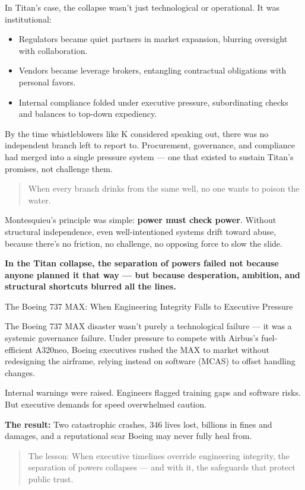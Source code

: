 \medskip

In Titan's case, the collapse wasn't just technological or operational. It was institutional:

\begin{itemize}
    \item Regulators became quiet partners in market expansion, blurring oversight with collaboration.
    \item Vendors became leverage brokers, entangling contractual obligations with personal favors.
    \item Internal compliance folded under executive pressure, subordinating checks and balances to top-down expediency.
\end{itemize}

By the time whistleblowers like K considered speaking out, there was no independent branch left to report to. Procurement, governance, and compliance had merged into a single pressure system — one that existed to sustain Titan's promises, not challenge them.

\medskip

\begin{quote}
    When every branch drinks from the same well, no one wants to poison the water.
\end{quote}

Montesquieu's principle was simple: \textbf{power must check power}. Without structural independence, even well-intentioned systems drift toward abuse, because there's no friction, no challenge, no opposing force to slow the slide.

\medskip

\textbf{In the Titan collapse, the separation of powers failed not because anyone planned it that way — but because desperation, ambition, and structural shortcuts blurred all the lines.}

\begin{HistoricalSidebar}{The Boeing 737 MAX: When Engineering Integrity Falls to Executive Pressure}

The Boeing 737 MAX disaster wasn't purely a technological failure — it was a systemic governance failure. Under pressure to compete with Airbus's fuel-efficient A320neo, Boeing executives rushed the MAX to market without redesigning the airframe, relying instead on software (MCAS) to offset handling changes.

\medskip

Internal warnings were raised. Engineers flagged training gaps and software risks. But executive demands for speed overwhelmed caution.

\medskip

\textbf{The result:} Two catastrophic crashes, 346 lives lost, billions in fines and damages, and a reputational scar Boeing may never fully heal from.

\begin{quote}
    The lesson: When executive timelines override engineering integrity, the separation of powers collapses — and with it, the safeguards that protect public trust.
\end{quote}

\end{HistoricalSidebar}

